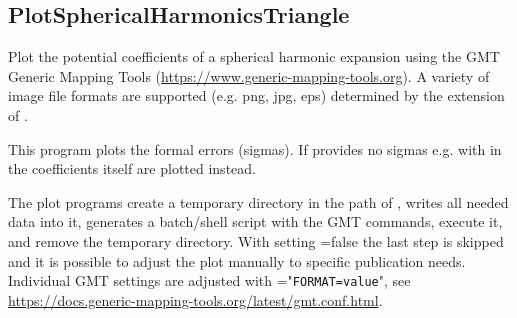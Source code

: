 \clearpage
\subsection{PlotSphericalHarmonicsTriangle}\label{PlotSphericalHarmonicsTriangle}
Plot the potential coefficients of a spherical harmonic expansion
using the GMT Generic Mapping Tools (\url{https://www.generic-mapping-tools.org}).
A variety of image file formats are supported (e.g. png, jpg, eps) determined by the extension of .

This program plots the formal errors (sigmas).
If  provides no sigmas
e.g. with  in 
the coefficients itself are plotted instead.

The plot programs create a temporary directory in the path of , writes all needed data into it,
generates a batch/shell script with the GMT commands, execute it, and remove the temporary directory.
With setting =false the last step is skipped and it is possible to adjust the plot manually
to specific publication needs. Individual GMT settings are adjusted with ="\verb|FORMAT=value|",
see \url{https://docs.generic-mapping-tools.org/latest/gmt.conf.html}.



